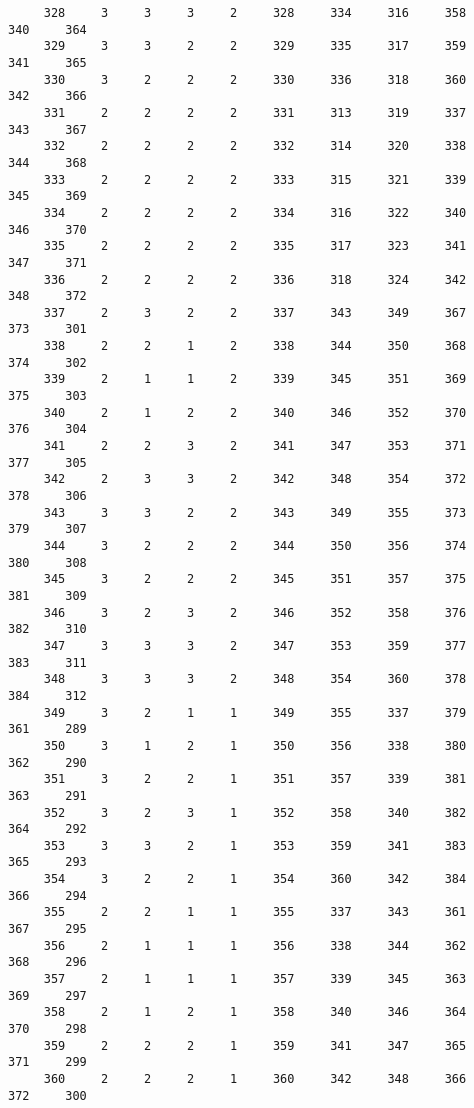 \begin{verbatim}
     328     3     3     3     2     328     334     316     358     340     364
     329     3     3     2     2     329     335     317     359     341     365
     330     3     2     2     2     330     336     318     360     342     366
     331     2     2     2     2     331     313     319     337     343     367
     332     2     2     2     2     332     314     320     338     344     368
     333     2     2     2     2     333     315     321     339     345     369
     334     2     2     2     2     334     316     322     340     346     370
     335     2     2     2     2     335     317     323     341     347     371
     336     2     2     2     2     336     318     324     342     348     372
     337     2     3     2     2     337     343     349     367     373     301
     338     2     2     1     2     338     344     350     368     374     302
     339     2     1     1     2     339     345     351     369     375     303
     340     2     1     2     2     340     346     352     370     376     304
     341     2     2     3     2     341     347     353     371     377     305
     342     2     3     3     2     342     348     354     372     378     306
     343     3     3     2     2     343     349     355     373     379     307
     344     3     2     2     2     344     350     356     374     380     308
     345     3     2     2     2     345     351     357     375     381     309
     346     3     2     3     2     346     352     358     376     382     310
     347     3     3     3     2     347     353     359     377     383     311
     348     3     3     3     2     348     354     360     378     384     312
     349     3     2     1     1     349     355     337     379     361     289
     350     3     1     2     1     350     356     338     380     362     290
     351     3     2     2     1     351     357     339     381     363     291
     352     3     2     3     1     352     358     340     382     364     292
     353     3     3     2     1     353     359     341     383     365     293
     354     3     2     2     1     354     360     342     384     366     294
     355     2     2     1     1     355     337     343     361     367     295
     356     2     1     1     1     356     338     344     362     368     296
     357     2     1     1     1     357     339     345     363     369     297
     358     2     1     2     1     358     340     346     364     370     298
     359     2     2     2     1     359     341     347     365     371     299
     360     2     2     2     1     360     342     348     366     372     300

\end{verbatim}
